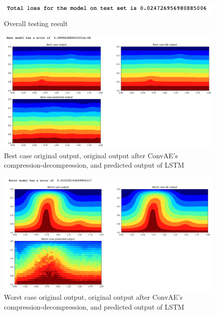 \begin{figure}[H]
    \caption{Overall testing result}
    \includegraphics[scale=0.8]{Report LaTeX/figures/mantle_convection_images/larger_dataset_interpolated/LSTM_OverallTesting.png}
\end{figure}

\begin{figure}[H]
    \caption{Best case original output, original output after ConvAE's compression-decompression, and predicted output of LSTM}
    \includegraphics[scale=0.5]{Report LaTeX/figures/mantle_convection_images/larger_dataset_interpolated/LSTM_Best.png}
\end{figure}

\begin{figure}[H]
    \caption{Worst case original output, original output after ConvAE's compression-decompression, and predicted output of LSTM}
    \includegraphics[scale=0.5]{Report LaTeX/figures/mantle_convection_images/larger_dataset_interpolated/LSTM_Worst.png}
\end{figure}



